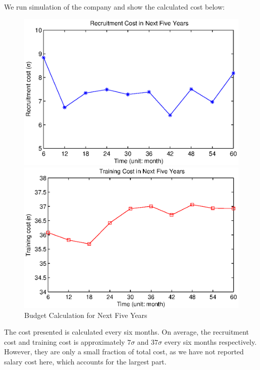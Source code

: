 \documentclass[tcn = 37075, sheet = false, abstract = false]{mcmthesis}
\begin{document}
We run simulation of the company and show the calculated cost below:

\begin{figure}[htbp]
\begin{minipage}[t]{0.5\linewidth}
\centering
\includegraphics[width=1.0\textwidth]{Recruitment_Cost.eps}
\end{minipage}%
\begin{minipage}[t]{0.5\linewidth}
\centering
\includegraphics[width=1.0\textwidth]{Training_Cost.eps}
\end{minipage}%
\caption{Budget Calculation for Next Five Years}
\end{figure}

The cost presented is calculated every six months. On average, the recruitment cost and training cost is approximately $7\sigma$ and $37\sigma$ every six months respectively. However, they are only a small fraction of total cost, as we have not reported salary cost here, which accounts for the largest part.
\end{document}
